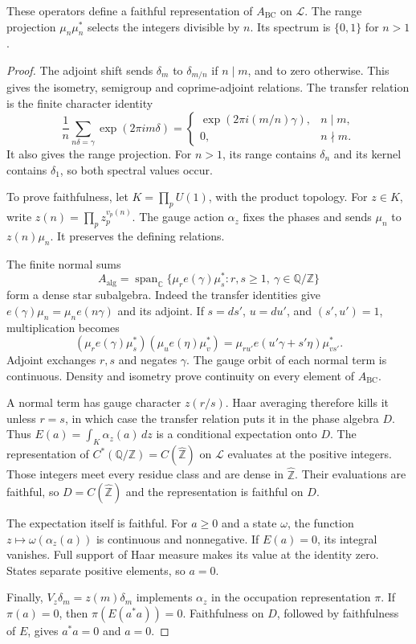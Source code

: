\begin{proposition}
\label{v4-arith:traces:bc-faithful}
These operators define a faithful representation of $A_{\mathrm{BC}}$ on
$\mathcal L$. The range projection $\mu_n\mu_n^*$ selects the integers
divisible by $n$. Its spectrum is $\{0,1\}$ for $n>1$.
\end{proposition}
\begin{proof}
The adjoint shift sends $\delta_m$ to $\delta_{m/n}$ if $n\mid m$, and to
zero otherwise. This gives the isometry, semigroup and coprime-adjoint
relations. The transfer relation is the finite character identity
\[
 \frac1n\sum_{n\delta=\gamma}\exp(2\pi i m\delta)
  =
  \begin{cases}
   \exp(2\pi i(m/n)\gamma),&n\mid m,\\
   0,&n\nmid m.
  \end{cases}
\]
It also gives the range projection. For $n>1$, its range contains $\delta_n$
and its kernel contains $\delta_1$, so both spectral values occur.

To prove faithfulness, let $K=\prod_p U(1)$, with the product topology. For
$z\in K$, write $z(n)=\prod_p z_p^{v_p(n)}$. The gauge action $\alpha_z$
fixes the phases and sends $\mu_n$ to $z(n)\mu_n$. It preserves the defining
relations.

The finite normal sums
\[
 A_{\mathrm{alg}}
  =\operatorname{span}_{\mathbb C}
     \{\mu_r e(\gamma)\mu_s^*:r,s\geq1,\ %
                              \gamma\in\mathbb Q/\mathbb Z\}
\]
form a dense star subalgebra. Indeed the transfer identities give
$e(\gamma)\mu_n=\mu_ne(n\gamma)$ and its adjoint. If $s=ds'$, $u=du'$, and
$(s',u')=1$, multiplication becomes
\[
 (\mu_re(\gamma)\mu_s^*)(\mu_ue(\eta)\mu_v^*)
   =\mu_{ru'}e(u'\gamma+s'\eta)\mu_{vs'}^*.
\]
Adjoint exchanges $r,s$ and negates $\gamma$. The gauge orbit of each normal
term is continuous. Density and isometry prove continuity on every element
of $A_{\mathrm{BC}}$.

A normal term has gauge character $z(r/s)$. Haar averaging therefore kills
it unless $r=s$, in which case the transfer relation puts it in the phase
algebra $D$. Thus $E(a)=\int_K\alpha_z(a)\,dz$ is a conditional expectation
onto $D$. The representation of $C^*(\mathbb Q/\mathbb Z)=C(\widehat{\mathbb
Z})$ on $\mathcal L$ evaluates at the positive integers. Those integers meet
every residue class and are dense in $\widehat{\mathbb Z}$. Their
evaluations are faithful, so $D=C(\widehat{\mathbb Z})$ and the
representation is faithful on $D$.

The expectation itself is faithful. For $a\geq0$ and a state $\omega$, the
function $z\mapsto\omega(\alpha_z(a))$ is continuous and nonnegative. If
$E(a)=0$, its integral vanishes. Full support of Haar measure makes its
value at the identity zero. States separate positive elements, so $a=0$.

Finally, $V_z\delta_m=z(m)\delta_m$ implements $\alpha_z$ in the occupation
representation $\pi$. If $\pi(a)=0$, then $\pi(E(a^*a))=0$. Faithfulness on
$D$, followed by faithfulness of $E$, gives $a^*a=0$ and $a=0$.
\end{proof}

